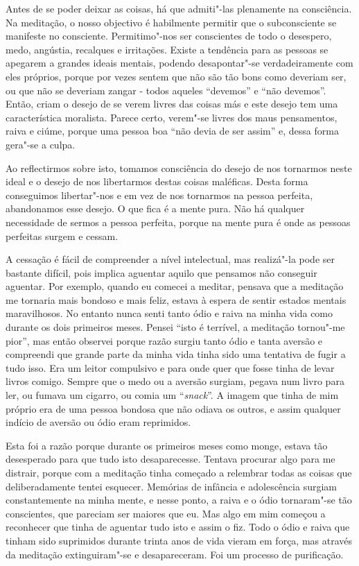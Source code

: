 Antes de se poder deixar as coisas, há que admiti"-las plenamente na consciência.
Na meditação, o nosso objectivo é habilmente permitir que o subconsciente se
manifeste no consciente. Permitimo"-nos ser conscientes de todo o desespero, medo, 
angústia, recalques e irritações. Existe a tendência para as
pessoas se apegarem a grandes ideais mentais, podendo desapontar"-se
verdadeiramente com eles próprios, porque por vezes sentem que não são tão bons
como deveriam ser, ou que não se deveriam zangar - todos aqueles “devemos” e “não
devemos”. Então, criam o desejo de se verem livres das coisas más e este desejo
tem uma característica moralista. Parece certo, verem"-se livres dos maus pensamentos,
raiva e ciúme, porque uma pessoa boa “não devia de ser assim” e, dessa forma
gera"-se a culpa.

Ao reflectirmos sobre isto, tomamos consciência do desejo de nos tornarmos neste
ideal e o desejo de nos libertarmos destas coisas maléficas. Desta forma conseguimos
libertar"-nos e em vez de nos tornarmos na pessoa perfeita, abandonamos esse
desejo. O que fica é a mente pura. Não há qualquer necessidade de sermos a
pessoa perfeita, porque na mente pura é onde as pessoas perfeitas surgem e
cessam.

A cessação é fácil de compreender a nível intelectual, mas realizá"-la pode ser
bastante difícil, pois implica aguentar aquilo que pensamos não conseguir aguentar. 
Por exemplo, quando eu comecei a meditar, pensava que a meditação me tornaria mais
bondoso e mais feliz, estava à espera de sentir estados mentais maravilhosos. No
entanto nunca senti tanto ódio e raiva na minha vida como durante os dois primeiros meses.
Pensei “isto é terrível, a meditação tornou"-me pior”, mas então observei
porque razão surgiu tanto ódio e tanta aversão e compreendi que grande parte da
minha vida tinha sido uma tentativa de fugir a tudo isso. Era um leitor
compulsivo e para onde quer que fosse tinha de levar livros comigo. Sempre que o
medo ou a aversão surgiam, pegava num livro para ler, ou fumava um cigarro, ou
comia um “\emph{snack}”. A imagem que tinha de mim próprio era de uma pessoa
bondosa que não odiava os outros, e assim qualquer indício de aversão ou ódio eram
reprimidos.

Esta foi a razão porque durante os primeiros meses como monge, estava tão
desesperado para que tudo isto desaparecesse. Tentava procurar algo para me distrair,
porque com a meditação tinha começado a relembrar todas as coisas que
deliberadamente tentei esquecer. Memórias de infância e adolescência surgiam
constantemente na minha mente, e nesse ponto, a raiva e o ódio tornaram"-se tão
conscientes, que pareciam ser maiores que eu. Mas algo em mim começou a
reconhecer que tinha de aguentar tudo isto e assim o fiz. Todo o ódio e raiva
que tinham sido suprimidos durante trinta anos de vida vieram em força, mas
através da meditação extinguiram"-se e desapareceram. Foi um processo de
purificação.

